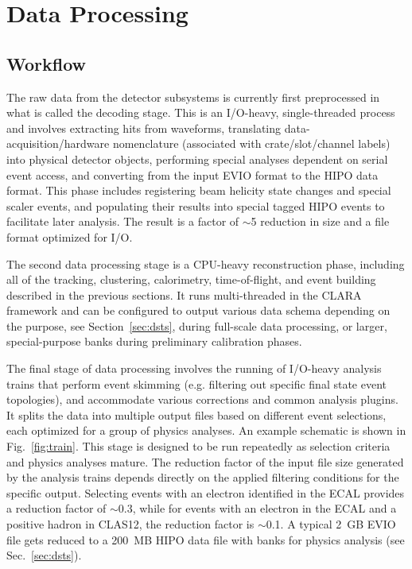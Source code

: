 \section{Data Processing}
\label{sec:dataproc}

\subsection{Workflow}

The raw data from the detector subsystems is currently first preprocessed in what is called the decoding
stage. This is an I/O-heavy, single-threaded process and involves extracting hits from waveforms, translating
data-acquisition/hardware nomenclature (associated with crate/slot/channel labels) into physical detector objects,
performing special analyses dependent on serial event access, and converting from the input EVIO format to the
HIPO data format.  This phase includes registering beam helicity state changes and special scaler events, and
populating their results into special tagged HIPO events to facilitate later analysis.  The result is a factor of
$\sim$5 reduction in size and a file format optimized for I/O.

The second data processing stage is a CPU-heavy reconstruction phase, including all of the tracking, clustering,
calorimetry, time-of-flight, and event building described in the previous sections.  It runs multi-threaded in the
CLARA framework and can be configured to output various data schema depending on the purpose, see
Section~\ref{sec:dsts}, during full-scale data processing, or larger, special-purpose banks during preliminary
calibration phases.

The final stage of data processing involves the running of I/O-heavy analysis trains that perform event skimming
(e.g. filtering out specific final state event topologies),  and accommodate various corrections and common analysis
plugins.  It splits the data into multiple output files based on different event selections, each optimized for a
group of physics analyses. An example schematic is shown in Fig.~\ref{fig:train}. This stage is designed to be run
repeatedly as selection criteria and physics analyses mature. The reduction factor of the input file size generated
by the analysis trains depends directly on the applied filtering conditions for the specific output. Selecting events
with an electron identified in the ECAL provides a reduction factor of $\sim$0.3, while for events with an electron
in the ECAL and a positive hadron in CLAS12, the reduction factor is $\sim$0.1.  A typical 2~GB EVIO file gets
reduced to a 200~MB HIPO data file with banks for physics analysis (see Sec.~\ref{sec:dsts}).

